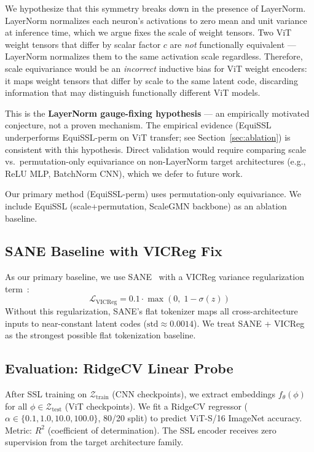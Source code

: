 We hypothesize that this symmetry breaks down in the presence of LayerNorm.
LayerNorm normalizes each neuron's activations to zero mean and unit variance at inference
time, which we argue fixes the scale of weight tensors.
Two ViT weight tensors that differ by scalar factor $c$ are \emph{not} functionally equivalent ---
LayerNorm normalizes them to the same activation scale regardless.
Therefore, scale equivariance would be an \emph{incorrect} inductive bias for ViT weight
encoders: it maps weight tensors that differ by scale to the same latent code,
discarding information that may distinguish functionally different ViT models.

This is the \textbf{LayerNorm gauge-fixing hypothesis} ---
an empirically motivated conjecture, not a proven mechanism.
The empirical evidence (EquiSSL underperforms EquiSSL-perm on ViT transfer;
see Section~\ref{sec:ablation}) is consistent with this hypothesis.
Direct validation would require comparing scale vs.\ permutation-only equivariance on
non-LayerNorm target architectures (e.g., ReLU MLP, BatchNorm CNN),
which we defer to future work.

Our primary method (EquiSSL-perm) uses permutation-only equivariance.
We include EquiSSL (scale+permutation, ScaleGMN backbone) as an ablation baseline.

\subsection{SANE Baseline with VICReg Fix}

As our primary baseline, we use SANE~\cite{Schurholt2024Towards} with a VICReg variance
regularization term~\cite{Bardes2021VICReg}:
\begin{equation}
  \mathcal{L}_\text{VICReg} = 0.1 \cdot \max(0,\; 1 - \sigma(z))
\end{equation}
Without this regularization, SANE's flat tokenizer maps all cross-architecture inputs to
near-constant latent codes ($\text{std} \approx 0.0014$).
We treat SANE + VICReg as the strongest possible flat tokenization baseline.

\subsection{Evaluation: RidgeCV Linear Probe}

After SSL training on $\mathcal{Z}_\text{train}$ (CNN checkpoints),
we extract embeddings $f_\theta(\phi)$ for all $\phi \in \mathcal{Z}_\text{test}$
(ViT checkpoints).
We fit a RidgeCV regressor ($\alpha \in \{0.1, 1.0, 10.0, 100.0\}$, 80/20 split)
to predict ViT-S/16 ImageNet accuracy.
Metric: $R^2$ (coefficient of determination).
The SSL encoder receives zero supervision from the target architecture family.
